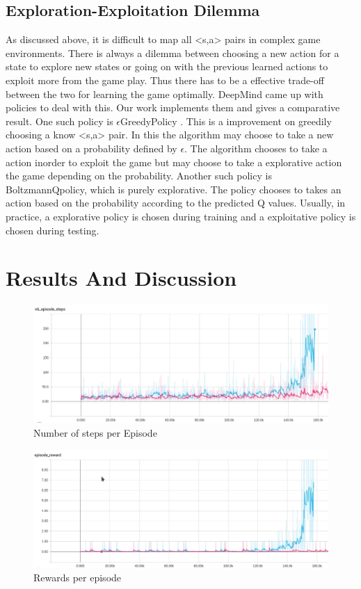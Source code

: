 \documentclass[conference,10pt]{IEEEtran}
\begin{document}
	\subsection{Exploration-Exploitation Dilemma}
	As discussed above, it is difficult to map all <s,a> pairs in complex game environments. There is always a dilemma between choosing a new action for a state to explore new states or going on with the previous learned actions to exploit more from the game play. Thus there has to be a effective trade-off between the two for learning the game optimally. DeepMind came up with policies to deal with this. Our work implements them and gives a comparative result.
	\break
	\break
	One such policy is \( \epsilon \)GreedyPolicy . This is a improvement on greedily choosing a know <s,a> pair. In this the algorithm may choose to take a new action based on a probability defined by  \( \epsilon \). The algorithm chooses to take a action inorder to exploit the game but may choose to take a explorative action the game depending on the probability.
	\break
	\break
	Another such policy is BoltzmannQpolicy, which is purely explorative. The policy chooses to takes an action based on the probability according to the predicted Q values. 
	\break
	\break
	Usually, in practice, a explorative policy is chosen during training and a exploitative policy is chosen during testing.

	
	\section{Results And Discussion}
	\begin{figure}[]
		
		\includegraphics[scale=0.23]{ep_step.jpeg}
		\caption{Number of steps per Episode}
		\label{step}
		
	\end{figure}
	\begin{figure}[]
		
		\includegraphics[scale=0.23]{ep_reward.jpeg}
		\caption{Rewards per episode}
		\label{reward}
		
	\end{figure}
\end{document}
